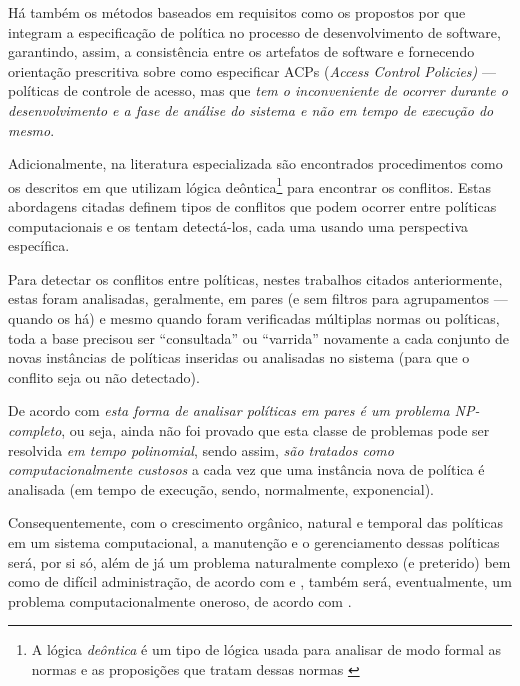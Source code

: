 \documentclass[
	12pt,				%
	openright,			%
	oneside,			%
	a4paper,			%
	english,			%
	french,				%
	spanish,			%
	brazil				%
	]{abntex2}
\begin{document}
Há também os métodos baseados em requisitos como os propostos por  que integram a especificação de política no processo de desenvolvimento de software, garantindo, assim, a consistência entre os artefatos de software e fornecendo orientação prescritiva sobre como especificar ACPs (\textit{Access Control Policies)} --- políticas de controle de acesso, mas que\textit{ tem o inconveniente de ocorrer durante o desenvolvimento e a fase de análise do sistema e não em tempo de execução do mesmo}.

Adicionalmente, na literatura especializada são encontrados procedimentos como os descritos em  que utilizam lógica deôntica\footnote{A lógica \textit{deôntica} é um tipo de lógica usada para analisar de modo formal as normas e as proposições que tratam dessas normas \cite{eduardo2017}} para encontrar os conflitos. Estas abordagens citadas definem tipos de conflitos que podem ocorrer entre políticas computacionais e os tentam detectá-los, cada uma usando uma perspectiva específica. 


Para detectar os conflitos entre políticas, nestes trabalhos citados anteriormente, estas foram analisadas, geralmente, em pares (e sem filtros para agrupamentos — quando os há) e mesmo quando foram verificadas múltiplas normas ou políticas, toda a base precisou ser “consultada” ou “varrida” novamente a cada conjunto de novas instâncias de políticas inseridas ou analisadas no sistema (para que o conflito seja ou não detectado).

De acordo com  \textit{esta forma de analisar políticas em pares é um problema NP-completo}, ou seja, ainda não foi provado que esta classe de problemas pode ser resolvida \textit{em tempo polinomial}, sendo assim, \textit{são tratados como computacionalmente custosos} a cada vez que uma instância nova de política é analisada (em tempo de execução, sendo, normalmente, exponencial). 

Consequentemente, com o crescimento orgânico, natural e temporal das políticas em um sistema computacional, a manutenção e o gerenciamento dessas políticas será, por si só, além de já um problema naturalmente complexo (e preterido) bem como de difícil administração, de acordo com  e , também será, eventualmente, um problema computacionalmente oneroso, de acordo com .
\end{document}
